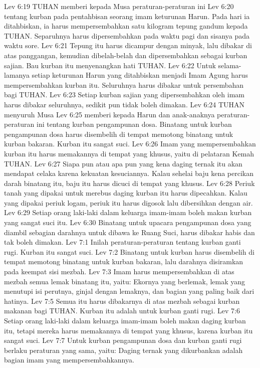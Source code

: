 Lev 6:19  TUHAN memberi kepada Musa peraturan-peraturan ini
Lev 6:20  tentang kurban pada pentahbisan seorang imam keturunan Harun. Pada hari ia ditahbiskan, ia harus mempersembahkan satu kilogram tepung gandum kepada TUHAN. Separuhnya harus dipersembahkan pada waktu pagi dan sisanya pada waktu sore.
Lev 6:21  Tepung itu harus dicampur dengan minyak, lalu dibakar di atas panggangan, kemudian dibelah-belah dan dipersembahkan sebagai kurban sajian. Bau kurban itu menyenangkan hati TUHAN.
Lev 6:22  Untuk selama-lamanya setiap keturunan Harun yang ditahbiskan menjadi Imam Agung harus mempersembahkan kurban itu. Seluruhnya harus dibakar untuk persembahan bagi TUHAN.
Lev 6:23  Setiap kurban sajian yang dipersembahkan oleh imam harus dibakar seluruhnya, sedikit pun tidak boleh dimakan.
Lev 6:24  TUHAN menyuruh Musa
Lev 6:25  memberi kepada Harun dan anak-anaknya peraturan-peraturan ini tentang kurban pengampunan dosa. Binatang untuk kurban pengampunan dosa harus disembelih di tempat memotong binatang untuk kurban bakaran. Kurban itu sangat suci.
Lev 6:26  Imam yang mempersembahkan kurban itu harus memakannya di tempat yang khusus, yaitu di pelataran Kemah TUHAN.
Lev 6:27  Siapa pun atau apa pun yang kena daging ternak itu akan mendapat celaka karena kekuatan kesuciannya. Kalau sehelai baju kena percikan darah binatang itu, baju itu harus dicuci di tempat yang khusus.
Lev 6:28  Periuk tanah yang dipakai untuk merebus daging kurban itu harus dipecahkan. Kalau yang dipakai periuk logam, periuk itu harus digosok lalu dibersihkan dengan air.
Lev 6:29  Setiap orang laki-laki dalam keluarga imam-imam boleh makan kurban yang sangat suci itu.
Lev 6:30  Binatang untuk upacara pengampunan dosa yang diambil sebagian darahnya untuk dibawa ke Ruang Suci, harus dibakar habis dan tak boleh dimakan.
Lev 7:1  Inilah peraturan-peraturan tentang kurban ganti rugi. Kurban itu sangat suci.
Lev 7:2  Binatang untuk kurban harus disembelih di tempat memotong binatang untuk kurban bakaran, lalu darahnya disiramkan pada keempat sisi mezbah.
Lev 7:3  Imam harus mempersembahkan di atas mezbah semua lemak binatang itu, yaitu: Ekornya yang berlemak, lemak yang menutupi isi perutnya, ginjal dengan lemaknya, dan bagian yang paling baik dari hatinya.
Lev 7:5  Semua itu harus dibakarnya di atas mezbah sebagai kurban makanan bagi TUHAN. Kurban itu adalah untuk kurban ganti rugi.
Lev 7:6  Setiap orang laki-laki dalam keluarga imam-imam boleh makan daging kurban itu, tetapi mereka harus memakannya di tempat yang khusus, karena kurban itu sangat suci.
Lev 7:7  Untuk kurban pengampunan dosa dan kurban ganti rugi berlaku peraturan yang sama, yaitu: Daging ternak yang dikurbankan adalah bagian imam yang mempersembahkannya.

